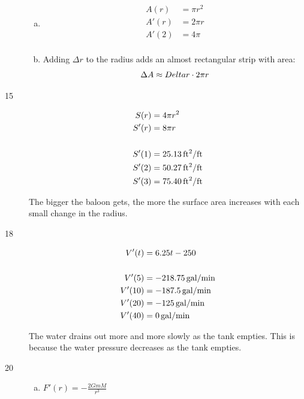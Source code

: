 \documentclass[letterpaper, landscape]{exam}
\begin{document}
\begin{description}
\begin{enumerate}[(a)]
        \item 
          \begin{align*}
            A(r)  & = \pi r^2 \\
            A'(r) & = 2 \pi r \\
            A'(2) & = 4 \pi \\
          \end{align*}

        \item Adding $\Delta r$ to the radius adds an almost rectangular strip with area:
          \[
            \Delta A \approx Delta r \cdot 2 \pi r \\
          \]
      \end{enumerate}

    \item[15]
      \begin{align*}
        S(r) &= 4 \pi r^2 \\
        S'(r) &= 8 \pi r \\
        \\
        S'(1) &= \unit[25.13]{ft^2/ft} \\
        S'(2) &= \unit[50.27]{ft^2/ft} \\
        S'(3) &= \unit[75.40]{ft^2/ft} \\
      \end{align*}

      The bigger the baloon gets, the more the surface area increases with each
      small change in the radius.

    \item[18]
      \begin{align*}
        V'(t)  & = 6.25t - 250 \\
        \\
        V'(5)  & = \unit[-218.75]{gal/min} \\
        V'(10) & = \unit[-187.5]{gal/min} \\
        V'(20) & = \unit[-125]{gal/min} \\
        V'(40) & = \unit[0]{gal/min} \\
      \end{align*}

      The water drains out more and more slowly as the tank empties. This is because
      the water pressure decreases as the tank empties.

    \item[20]
      \begin{enumerate}[(a)]
        \item $F'(r) = -\frac{2 G m M}{r^3}$


\end{enumerate}
\end{description}
\end{document}
